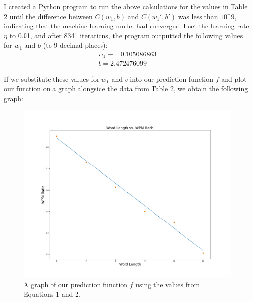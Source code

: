 \documentclass[12pt]{article}
\begin{document}
I created a Python program to run the above calculations for the values in Table 2 until the difference between $C(w_1, b)$ and $C(w_1', b')$ was less than $10^-9$, indicating that the machine learning model had converged. I set the learning rate $\eta$ to 0.01, and after 8341 iterations, the program outputted the following values for $w_1$ and $b$ (to 9 decimal places):
\begin{align}
	w_1 = -0.105086863 \\
	b = 2.472476099
\end{align}

If we substitute these values for $w_1$ and $b$ into our prediction function $f$ and plot our function on a graph alongside the data from Table 2, we obtain the following graph:
\begin{figure}[H]
	\centering
	\caption{A graph of our prediction function $f$ using the values from Equations 1 and 2.}
	\includegraphics[width=\textwidth]{word-length-vs-wpm-ratio.png}
\end{figure}
\end{document}
